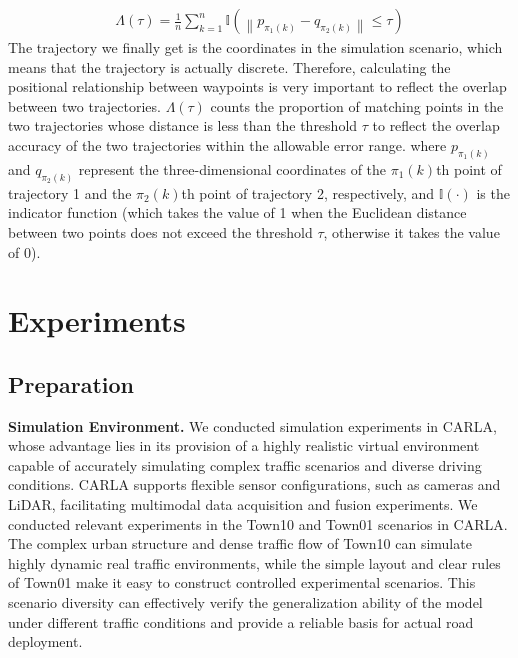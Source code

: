\documentclass[journal,twoside,web]{ieeecolor}
\begin{document}
\begin{align}
	\Lambda(\tau) = \frac{1}{n} \sum_{k=1}^{n} \mathbb{I}\left(\left\|p_{\pi_{1}(k)}-q_{\pi_{2}(k)}\right\| \leq \tau\right)
\end{align}
The trajectory we finally get is the coordinates in the simulation scenario, which means that the trajectory is actually discrete.
Therefore, calculating the positional relationship between waypoints is very important to reflect the overlap between two trajectories.
\(\Lambda(\tau)\) counts the proportion of matching points in the two trajectories whose distance is less than the threshold \(\tau\) to reflect the overlap accuracy of the two trajectories within the allowable error range.
where \(p_{\pi_{1}(k)}\) and \(q_{\pi_{2}(k)}\) represent the three-dimensional coordinates of the \(\pi_{1}(k)\)th point of trajectory 1 and the \(\pi_{2}(k)\)th point of trajectory 2, respectively, and \(\mathbb{I}(\cdot)\) is the indicator function (which takes the value of 1 when the Euclidean distance between two points does not exceed the threshold \(\tau\), otherwise it takes the value of 0).


\section{Experiments}

\subsection{Preparation}

\textbf{Simulation Environment.}
We conducted simulation experiments in CARLA, whose advantage lies in its provision of a highly realistic virtual environment capable of accurately simulating complex traffic scenarios and diverse driving conditions. 
CARLA supports flexible sensor configurations, such as cameras and LiDAR, facilitating multimodal data acquisition and fusion experiments\cite{Alpher22e}. 
We conducted relevant experiments in the Town10 and Town01 scenarios in CARLA.
The complex urban structure and dense traffic flow of Town10 can simulate highly dynamic real traffic environments, while the simple layout and clear rules of Town01 make it easy to construct controlled experimental scenarios.
This scenario diversity can effectively verify the generalization ability of the model under different traffic conditions and provide a reliable basis for actual road deployment.
\end{document}
